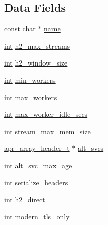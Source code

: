 \subsection*{Data Fields}
\begin{DoxyCompactItemize}
\item 
const char $\ast$ \hyperlink{structh2__config_a19fbfcc24484a42878381a44bc84c31f}{name}
\item 
\hyperlink{pcre_8txt_a42dfa4ff673c82d8efe7144098fbc198}{int} \hyperlink{structh2__config_a953d12880d26f6bd09716d1b16600b9d}{h2\+\_\+max\+\_\+streams}
\item 
\hyperlink{pcre_8txt_a42dfa4ff673c82d8efe7144098fbc198}{int} \hyperlink{structh2__config_ad443266c03caa6f7adba8fdd78af401b}{h2\+\_\+window\+\_\+size}
\item 
\hyperlink{pcre_8txt_a42dfa4ff673c82d8efe7144098fbc198}{int} \hyperlink{structh2__config_a2ba8abc690a6e1047d2b98171d77edbf}{min\+\_\+workers}
\item 
\hyperlink{pcre_8txt_a42dfa4ff673c82d8efe7144098fbc198}{int} \hyperlink{structh2__config_af0b7b668f4d2eb2c1fa773469c27225a}{max\+\_\+workers}
\item 
\hyperlink{pcre_8txt_a42dfa4ff673c82d8efe7144098fbc198}{int} \hyperlink{structh2__config_abb308fed180836f14bdae6f4bed17881}{max\+\_\+worker\+\_\+idle\+\_\+secs}
\item 
\hyperlink{pcre_8txt_a42dfa4ff673c82d8efe7144098fbc198}{int} \hyperlink{structh2__config_a29f81642528a884aaca75dc06318335f}{stream\+\_\+max\+\_\+mem\+\_\+size}
\item 
\hyperlink{structapr__array__header__t}{apr\+\_\+array\+\_\+header\+\_\+t} $\ast$ \hyperlink{structh2__config_aec3089e968a8586ba81a2063098f73a8}{alt\+\_\+svcs}
\item 
\hyperlink{pcre_8txt_a42dfa4ff673c82d8efe7144098fbc198}{int} \hyperlink{structh2__config_ae9c50db419b0892a8620485d2e3d6fb7}{alt\+\_\+svc\+\_\+max\+\_\+age}
\item 
\hyperlink{pcre_8txt_a42dfa4ff673c82d8efe7144098fbc198}{int} \hyperlink{structh2__config_a9f5232325eae81c8ba09db12c364d9b1}{serialize\+\_\+headers}
\item 
\hyperlink{pcre_8txt_a42dfa4ff673c82d8efe7144098fbc198}{int} \hyperlink{structh2__config_a405c07f07dc4a0134e02c0f453fb561d}{h2\+\_\+direct}
\item 
\hyperlink{pcre_8txt_a42dfa4ff673c82d8efe7144098fbc198}{int} \hyperlink{structh2__config_a3e66874a31edb09becc45b116125ced4}{modern\+\_\+tls\+\_\+only}
\item 

\end{DoxyCompactItemize}
